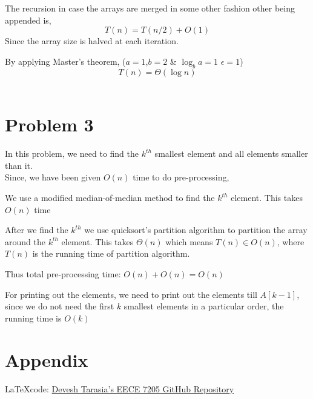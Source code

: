 \documentclass[12pt,letterpaper]{article}
\begin{document}
  The recursion in case the arrays are merged in some other fashion other being appended is,
  $$T(n) = T(n/2) + O(1)$$
  Since the array size is halved at each iteration.
  
  
  By applying Master's theorem, ($a=1$,$b=2$ & $\log_b a = 1$ $\epsilon = 1$) 
  $$T(n) = \Theta (\log n)$$\\
  
  
  
\section*{Problem 3}
  In this problem, we need to find the $k^{th}$ smallest element and all elements smaller than it.\\
  
  Since, we have been given $O(n)$ time to do pre-processing, 
  
  We use a modified median-of-median method to find the $k^{th}$ element. This takes $O(n)$ time 
  
  After we find the $k^{th}$ we use quicksort's partition algorithm to partition the array around the $k^{th}$ element. This takes $\Theta(n)$ which means $T(n) \in O(n)$, where $T(n)$ is the running time of partition algorithm.
  
  Thus total pre-processing time: $O(n)+O(n)=O(n)$
  
  For printing out the elements, we need to print out the elements till $A[k-1]$, since we do not need the first $k$ smallest elements in a particular order, the running time is $O(k)$
  
  \newpage
  \section*{Appendix}
  \LaTeX code: \href{https://github.com/DEVESHTARASIA/EECE-7205/blob/main/HW2.tex}{Devesh Tarasia's EECE 7205 GitHub Repository}
  
  
  
\end{document}
